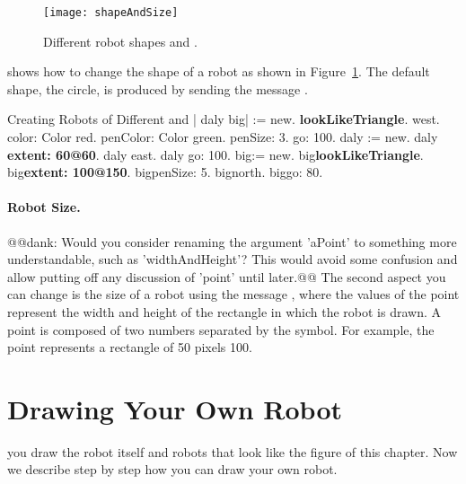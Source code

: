 \begin{figure}[h]
\begin{center}
\texttt{[image: shapeAndSize]}
\caption{Different robot shapes and . \label{fig:shapeAndSize}}
\end{center}
\end{figure}

 shows how to change the shape of a robot  as shown in Figure~\ref{fig:shapeAndSize}.  The default shape, the circle, is produced by sending the message    . 

\begin{scriptwithtitle}{Creating Robots of Different  and }\label{scr:differentsize}
| \caro daly  big\caro |
\caro := \Turtle new.
\caro \textbf{lookLikeTriangle}.
\caro west.
\caro color: Color red.
\caro penColor: Color green.
\caro penSize: 3.
\caro go: 100.
daly := \Turtle new.
daly \textbf{extent: 60@60}.
daly east.
daly go: 100.
big\caro := \Turtle new.
big\caro \textbf{lookLikeTriangle}.
big\caro \textbf{extent: 100@150}.
big\caro penSize: 5.
big\caro north.
big\caro go: 80.
\end{scriptwithtitle}


\paragraph{Robot Size.}@@dank: Would you consider renaming the argument 'aPoint' to something more understandable, such as 'widthAndHeight'?  This would avoid some confusion and allow putting off any discussion of 'point' until later.@@
The second aspect you can change is the size of a robot using the message  , where the values of the point represent the width and height of the rectangle in which the robot is drawn. A point is composed of two numbers separated by the  symbol. For example, the point  represents a rectangle of 50 pixels  100.







\section{Drawing Your Own Robot}\label{sec:drawingTurtle}
 you  draw the robot itself and  robots that look like the  figure  of this chapter. Now we describe step by step how you can draw your own robot. 

